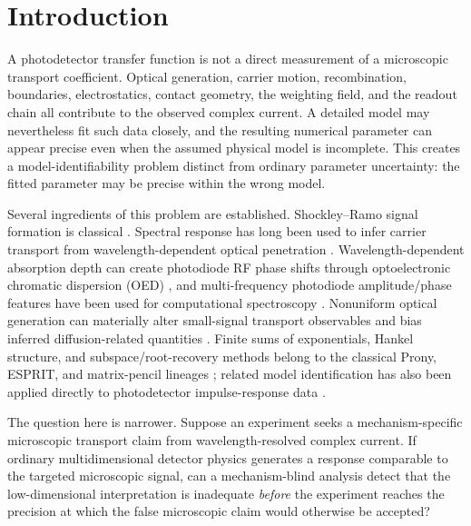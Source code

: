 \documentclass[11pt]{article}
\begin{document}
\section{Introduction}

A photodetector transfer function is not a direct measurement of a microscopic transport coefficient. Optical generation, carrier motion, recombination, boundaries, electrostatics, contact geometry, the weighting field, and the readout chain all contribute to the observed complex current. A detailed model may nevertheless fit such data closely, and the resulting numerical parameter can appear precise even when the assumed physical model is incomplete. This creates a model-identifiability problem distinct from ordinary parameter uncertainty: the fitted parameter may be precise within the wrong model.

Several ingredients of this problem are established. Shockley--Ramo signal formation is classical \cite{Shockley1938,Ramo1939,Dabrowski1989}. Spectral response has long been used to infer carrier transport from wavelength-dependent optical penetration \cite{Goodman1961,Geist1980}. Wavelength-dependent absorption depth can create photodiode RF phase shifts through optoelectronic chromatic dispersion (OED) \cite{Glasser2021,Liokumovitch2021,Dutta2024}, and multi-frequency photodiode amplitude/phase features have been used for computational spectroscopy \cite{Kassa2026}. Nonuniform optical generation can materially alter small-signal transport observables and bias inferred diffusion-related quantities \cite{Halme2008}. Finite sums of exponentials, Hankel structure, and subspace/root-recovery methods belong to the classical Prony, ESPRIT, and matrix-pencil lineages \cite{Prony1795,RoyKailath1989,HuaSarkar1990}; related model identification has also been applied directly to photodetector impulse-response data \cite{Sun2025}.

The question here is narrower. Suppose an experiment seeks a mechanism-specific microscopic transport claim from wavelength-resolved complex current. If ordinary multidimensional detector physics generates a response comparable to the targeted microscopic signal, can a mechanism-blind analysis detect that the low-dimensional interpretation is inadequate \emph{before} the experiment reaches the precision at which the false microscopic claim would otherwise be accepted?
\end{document}
